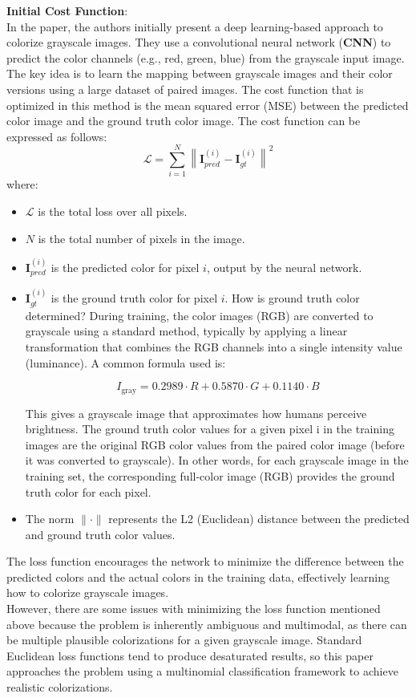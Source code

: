 \documentclass{article}
\begin{document}
\begin{enumerate}
\textbf{Initial Cost Function}:\\
In the paper, the authors initially present a deep learning-based approach to colorize grayscale images. They use a convolutional neural network (\textbf{CNN}) to predict the color channels (e.g., red, green, blue) from the grayscale input image. The key idea is to learn the mapping between grayscale images and their color versions using a large dataset of paired images. The cost function that is optimized in this method is the mean squared error (MSE) between the predicted color image and the ground truth color image. The cost function can be expressed as follows:
\[
\mathcal{L} = \sum_{i=1}^{N} \left\| \mathbf{I}_{pred}^{(i)} - \mathbf{I}_{gt}^{(i)} \right\|^2
\]
where:
\begin{itemize}
    \item \( \mathcal{L} \) is the total loss over all pixels.
    \item \( N \) is the total number of pixels in the image.
    \item \( \mathbf{I}_{pred}^{(i)} \) is the predicted color for pixel \( i \), output by the neural network.
    \item \( \mathbf{I}_{gt}^{(i)} \) is the ground truth color for pixel \( i \). How is ground truth color determined? During training, the color images (RGB) are converted to grayscale using a standard method, typically by applying a linear transformation that combines the RGB channels into a single intensity value (luminance). A common formula used is:

\[
I_{\text{gray}} = 0.2989 \cdot R + 0.5870 \cdot G + 0.1140 \cdot B
\]

This gives a grayscale image that approximates how humans perceive brightness. The ground truth color values for a given pixel i in the training images are the original RGB color values from the paired color image (before it was converted to grayscale). In other words, for each grayscale image in the training set, the corresponding full-color image (RGB) provides the ground truth color for each pixel.

\item The norm \( \| \cdot \| \) represents the L2 (Euclidean) distance between the predicted and ground truth color values.

\end{itemize}
The loss function encourages the network to minimize the difference between the predicted colors and the actual colors in the training data, effectively learning how to colorize grayscale images. \\
However, there are some issues with minimizing the loss function mentioned above because the problem is inherently ambiguous and multimodal, as there can be multiple plausible colorizations for a given grayscale image. Standard Euclidean loss functions tend to produce desaturated results, so this paper approaches the problem using a multinomial classification framework to achieve realistic colorizations.


\end{enumerate}
\end{document}
